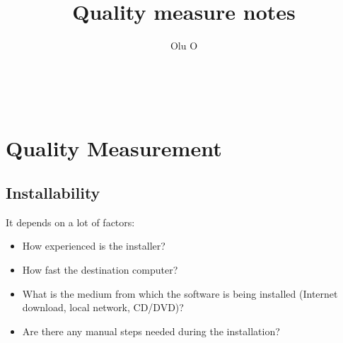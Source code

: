 \documentclass{article}
\title{Quality measure notes}
\author{Olu O}
\date{}
\begin{document}
\maketitle

~\newpage
\section{Quality Measurement}
\subsection{Installability}

It depends on a lot of factors:
\begin{itemize}
	\item How experienced is the installer?
	\item How fast the destination computer?
	\item What is the medium from which the software is being installed (Internet download, local network, CD/DVD)?
	\item Are there any manual steps needed during the installation?
\end{itemize}
\subsubitem\citep{SmithEtAl2018}
\end{document}
